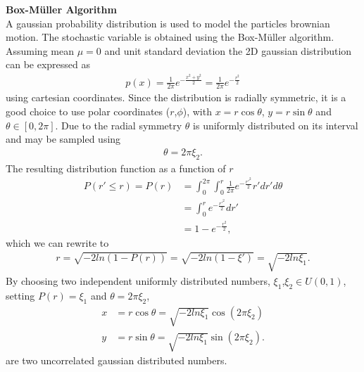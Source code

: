 \documentclass[11pt,a4paper]{article}
\begin{document}
\textbf{Box-Müller Algorithm} \\
A gaussian probability distribution is used to model the particles brownian motion. The stochastic variable
 is obtained using the Box-Müller algorithm. Assuming mean $\mu = 0$ and unit
standard deviation the 2D gaussian distribution can be expressed as
\begin{align*}
   p(x) = \frac{1}{2 \pi }e^{-\frac{x^2 + y^2}{2}} = \frac{1}{2 \pi }e^{-\frac{r^2}{2}}
\end{align*}
using cartesian coordinates. Since the distribution is radially symmetric, it is a good choice
to use polar coordinates ($r$,$\phi$), with $x = r \cos \theta$, $y = r \sin \theta$ 
and $\theta \in [0,2\pi]$. Due to the radial symmetry $\theta$ is uniformly distributed on its interval
and may be sampled using
\begin{align*}
   \theta = 2 \pi \xi_2.
\end{align*}
The resulting distribution function as a function of $r$
\begin{align*}
   P(r' \leq r) = P(r) &= \int_0^{2\pi} \int_0^r \frac{1}{2 \pi }e^{-\frac{r'^2}{2}} r' dr' d\theta \\
                       &= \int_0^r e^{-\frac{r'^2}{2}} dr' \\
                       &= 1-e^{-\frac{r^2}{2}},
\end{align*}
which we can rewrite to 
\begin{align*}
   r = \sqrt{-2ln(1-P(r))} = \sqrt{-2ln(1-\xi')} = \sqrt{-2ln \xi_1}.
\end{align*}
By choosing two independent uniformly distributed numbers, 
$\xi_1$,$\xi_2 \in U(0,1)$, setting $P(r) = \xi_1$ and $\theta = 2 \pi \xi_2 $,
\begin{align}
   x &= r \cos \theta = \sqrt{-2ln \xi_1} \cos (2 \pi \xi_2) \\
   y &= r \sin \theta = \sqrt{-2ln \xi_1} \sin (2 \pi \xi_2).
\end{align}
are two uncorrelated gaussian distributed numbers.
\end{document}

